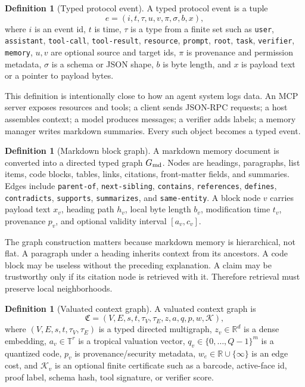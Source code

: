 \documentclass[11pt]{article}
\theoremstyle{definition}
\newtheorem{definition}[theorem]{Definition}
\theoremstyle{remark}
\newcommand{\T}{\mathbb{T}}
\newcommand{\R}{\mathbb{R}}
\begin{document}
\begin{definition}[Typed protocol event]
A typed protocol event is a tuple
\[
    e=(i,t,\tau,u,v,\pi,\sigma,b,x),
\]
where \(i\) is an event id, \(t\) is time, \(\tau\) is a type from a finite set such as \texttt{user}, \texttt{assistant}, \texttt{tool-call}, \texttt{tool-result}, \texttt{resource}, \texttt{prompt}, \texttt{root}, \texttt{task}, \texttt{verifier}, \texttt{memory}, \(u,v\) are optional source and target ids, \(\pi\) is provenance and permission metadata, \(\sigma\) is a schema or JSON shape, \(b\) is byte length, and \(x\) is payload text or a pointer to payload bytes.
\end{definition}

This definition is intentionally close to how an agent system logs data. An MCP server exposes resources and tools; a client sends JSON-RPC requests; a host assembles context; a model produces messages; a verifier adds labels; a memory manager writes markdown summaries. Every such object becomes a typed event.

\begin{definition}[Markdown block graph]
A markdown memory document is converted into a directed typed graph \(G_{\rm md}\). Nodes are headings, paragraphs, list items, code blocks, tables, links, citations, front-matter fields, and summaries. Edges include \texttt{parent-of}, \texttt{next-sibling}, \texttt{contains}, \texttt{references}, \texttt{defines}, \texttt{contradicts}, \texttt{supports}, \texttt{summarizes}, and \texttt{same-entity}. A block node \(v\) carries payload text \(x_v\), heading path \(h_v\), local byte length \(b_v\), modification time \(t_v\), provenance \(p_v\), and optional validity interval \([a_v,c_v]\).
\end{definition}

The graph construction matters because markdown memory is hierarchical, not flat. A paragraph under a heading inherits context from its ancestors. A code block may be useless without the preceding explanation. A claim may be trustworthy only if its citation node is retrieved with it. Therefore retrieval must preserve local neighborhoods.

\begin{definition}[Valuated context graph]
A valuated context graph is
\[
    \mathfrak C=(V,E,s,t,\tau_V,\tau_E,z,a,q,p,w,\mathcal K),
\]
where \((V,E,s,t,\tau_V,\tau_E)\) is a typed directed multigraph, \(z_v\in\R^d\) is a dense embedding, \(a_v\in\T^r\) is a tropical valuation vector, \(q_v\in\{0,\ldots,Q-1\}^m\) is a quantized code, \(p_v\) is provenance/security metadata, \(w_e\in\R\cup\{\infty\}\) is an edge cost, and \(\mathcal K_v\) is an optional finite certificate such as a barcode, active-face id, proof label, schema hash, tool signature, or verifier score.
\end{definition}
\end{document}
